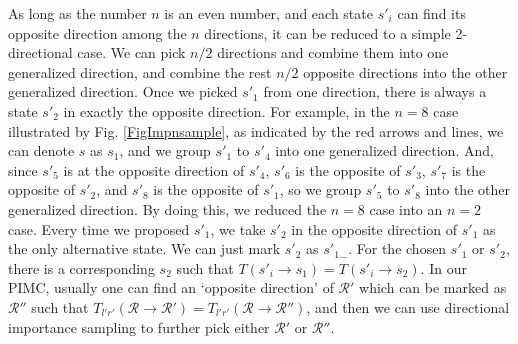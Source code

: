\documentclass[12pt,letterpaper,UTF8]{report}
\begin{document}
As long as the number $n$ is an even number,
and each state $s'_i$ can find its opposite direction among the $n$ directions,
it can be reduced to a simple 2-directional case. We can pick $n/2$ directions and combine them into one generalized direction, and combine the rest $n/2$ opposite directions into the other generalized direction.
Once we picked $s'_1$ from one direction, there is always a state $s'_2$ in exactly the opposite direction.
For example, in the $n=8$ case illustrated by Fig. \ref{FigImpnsample}, as indicated by the red arrows and lines, we can denote $s$ as $s_1$, and we group $s'_1$ to $s'_4$ into one generalized direction.
And, since $s'_5$ is at the opposite direction of $s'_4$, $s'_6$ is the opposite of $s'_3$, $s'_7$ is the opposite of $s'_2$, and $s'_8$ is the opposite of $s'_1$, so we group $s'_5$ to $s'_8$ into the other generalized direction.
By doing this, we reduced the $n=8$ case into an $n=2$ case.
Every time we proposed $s'_1$, we take $s'_2$ in the opposite direction of $s'_1$ as the only alternative state.
We can just mark $s'_2$ as ${s'_1}_{-}$.
For the chosen $s'_1$ or $s'_2$, there is a corresponding $s_2$ such that $T(s'_i\rightarrow s_1)=T(s'_i\rightarrow s_2)$.
In our PIMC, usually one can find an `opposite direction' of $\mathcal{R}'$ which can be marked as $\mathcal{R}''$ such that $T_{l'r'}(\mathcal{R} \rightarrow \mathcal{R}')=T_{l'r'}(\mathcal{R} \rightarrow \mathcal{R}'')$, and then we can use directional importance sampling to further pick either $\mathcal{R}'$ or $\mathcal{R}''$.
\end{document}
